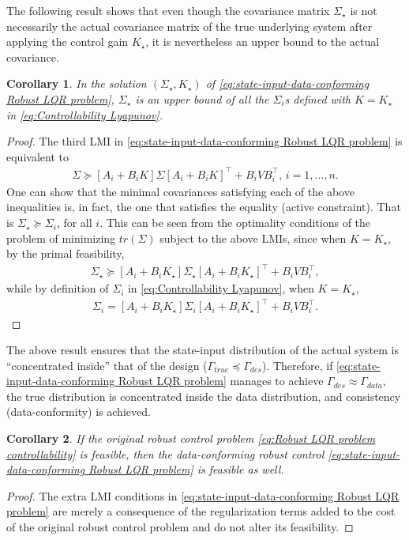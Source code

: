 \documentclass[letterpaper, 10 pt, conference]{ieeeconf}
\newcommand{\trace}{\textit{tr}}
\newtheorem*{corollary}{Corollary}
\begin{document}
The following result shows that even though the covariance matrix $\Sigma_\star$ is not necessarily the actual covariance matrix of the true underlying system after applying the control gain $K_\star$, it is nevertheless an upper bound to the actual covariance.
\begin{corollary}
    In the solution $(\Sigma_\star, K_\star)$ of \eqref{eq:state-input-data-conforming Robust LQR problem}, $\Sigma_\star$ is an upper bound of all the $\Sigma_i$s defined with $K=K_\star$ in \eqref{eq:Controllability Lyapunov}.
\end{corollary}
\begin{proof}
The third LMI in \eqref{eq:state-input-data-conforming Robust LQR problem} is equivalent to \cite{boyd1994linear}
\begin{align*}
    \Sigma \succeq \left [ A_i+B_iK\right ] \Sigma \left [ A_i+B_iK\right ]^\top + B_iV B_i^\top, \,i=1,\hdots,n.
\end{align*}
One can show that the minimal covariances satisfying each of the above inequalities is, in fact, the one that satisfies the equality (active constraint). That is $\Sigma_\star \succeq \Sigma_i$, for all $i$. This can be seen from the optimality conditions of the problem of minimizing $\trace(\Sigma)$ subject to the above LMIs, since when $K = K_\star$, by the primal feasibility,
\begin{align*}
    \Sigma_\star \succeq \left [ A_i+B_iK_\star\right ] \Sigma_\star \left [ A_i+B_iK_\star\right ]^\top + B_iV B_i^\top,
\end{align*}
while by definition of $\Sigma_i$ in \eqref{eq:Controllability Lyapunov}, when $K=K_\star$,
\begin{align*}
    \Sigma_i = \left [ A_i+B_iK_\star\right ] \Sigma_i \left [ A_i+B_iK_\star\right ]^\top + B_iV B_i^\top.
\end{align*}
\end{proof}

The above result ensures that the state-input distribution of the actual system is ``concentrated inside'' that of the design ($\Gamma_{true} \preceq \Gamma_{des}$). Therefore, if \eqref{eq:state-input-data-conforming Robust LQR problem} manages to achieve $\Gamma_{des} \approx \Gamma_{data}$, the true distribution is concentrated inside the data distribution, and consistency (data-conformity) is achieved.

\begin{corollary}
    If the original robust control problem \eqref{eq:Robust LQR problem controllability} is feasible, then the data-conforming robust control \eqref{eq:state-input-data-conforming Robust LQR problem} is feasible as well.
\end{corollary}
\begin{proof}
    The extra LMI conditions in \eqref{eq:state-input-data-conforming Robust LQR problem} are merely a consequence of the regularization terms added to the cost of the original robust control problem and do not alter its feasibility.
\end{proof}
\end{document}

